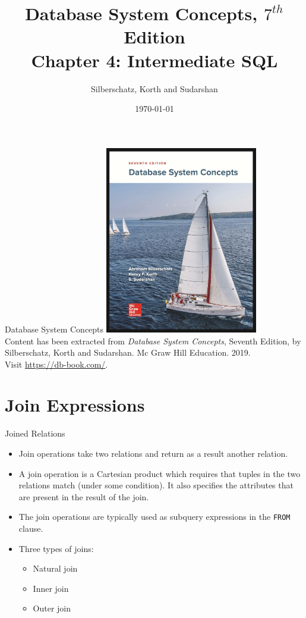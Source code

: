 \documentclass{beamer}
\title[Chapter 4]{Database System Concepts, $7^{th}$ Edition \\ Chapter 4: Intermediate SQL}
\author{Silberschatz, Korth and Sudarshan}
\date{\today}
\begin{document}
\frame{\titlepage}

\begin{frame}{Database System Concepts}
    \centering
    \includegraphics[width=0.5\textwidth]{figures/book_cover.jpg} \\
    \vspace{5mm}
    {
        \tiny
        Content has been extracted from \textit{Database System Concepts}, Seventh Edition, by Silberschatz, Korth and Sudarshan. Mc Graw Hill Education. 2019.\\
        Visit \url{https://db-book.com/}.\\
    }
\end{frame}

\section{Join Expressions}

\begin{frame}{Joined Relations}
    \begin{itemize}
        \item Join operations take two relations and return as a result another relation.
        \item A join operation is a Cartesian product which requires that tuples in the two relations match (under some condition). It also specifies the attributes that are present in the result of the join.
        \item The join operations are typically used as subquery expressions in the \texttt{FROM} clause.
        \item Three types of joins:
        \begin{itemize}
            \item Natural join
            \item Inner join
            \item Outer join
        \end{itemize}
    \end{itemize}
\end{frame}
\end{document}
